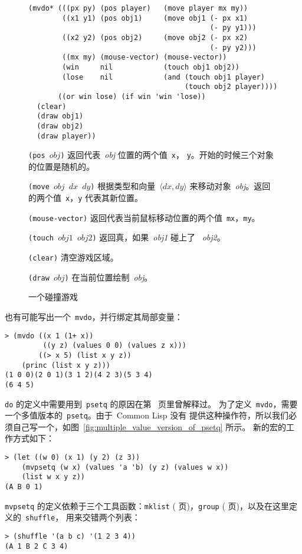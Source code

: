 \begin{figure}
\begin{lstlisting}
(mvdo* (((px py) (pos player)   (move player mx my))
        ((x1 y1) (pos obj1)     (move obj1 (- px x1)
                                           (- py y1)))
        ((x2 y2) (pos obj2)     (move obj2 (- px x2)
                                           (- py y2)))
        ((mx my) (mouse-vector) (mouse-vector))
        (win     nil            (touch obj1 obj2))
        (lose    nil            (and (touch obj1 player)
                                     (touch obj2 player))))
       ((or win lose) (if win 'win 'lose))
  (clear)
  (draw obj1)
  (draw obj2)
  (draw player))
\end{lstlisting}
  \texttt{(pos $obj$)} 返回代表~\emph{obj} 位置的两个值~\texttt{x}，
  \texttt{y}。开始的时候三个对象的位置是随机的。

  \texttt{(move $obj$ $dx$ $dy$)} 根据类型和向量~$\langle dx,dy \rangle$
  来移动对象~\emph{obj}。返回的两个值~\texttt{x}，\texttt{y} 代表其新位置。

  \texttt{(mouse-vector)} 返回代表当前鼠标移动位置的两个值~\texttt{mx}，\texttt{my}。

  \texttt{(touch $obj1$ $obj2$)} 返回真，如果~\emph{obj1} 碰上了
  ~\emph{obj2}。

  \texttt{(clear)} 清空游戏区域。

  \texttt{(draw $obj$)} 在当前位置绘制~\emph{obj}。
  \caption{一个碰撞游戏}
  \label{fig:a_game_of_squash}
\end{figure}

也有可能写出一个~\texttt{mvdo}，并行绑定其局部变量：
\begin{lstlisting}
> (mvdo ((x 1 (1+ x))
         ((y z) (values 0 0) (values z x)))
        ((> x 5) (list x y z))
    (princ (list x y z)))
(1 0 0)(2 0 1)(3 1 2)(4 2 3)(5 3 4)
(6 4 5)
\end{lstlisting}

\verb|do| 的定义中需要用到~\verb|psetq| 的原因在第~\pageref{desc:psetq} 页里曾解释过。
为了定义~\texttt{mvdo}，需要一个多值版本的~\texttt{psetq}。由于~Common Lisp 没有
提供这种操作符，所以我们必须自己写一个，如图~\ref{fig:multiple_value_version_of_psetq} 所示。
新的宏的工作方式如下：
\begin{lstlisting}
> (let ((w 0) (x 1) (y 2) (z 3))
    (mvpsetq (w x) (values 'a 'b) (y z) (values w x))
    (list w x y z))
(A B 0 1)
\end{lstlisting}
\texttt{mvpsetq} 的定义依赖于三个工具函数：\texttt{mklist} (\pageref{fun:mklist}
页)，\texttt{group} (\pageref{fun:group} 页)，以及在这里定义的~\texttt{shuffle}，
用来交错两个列表：
\begin{lstlisting}
> (shuffle '(a b c) '(1 2 3 4))
(A 1 B 2 C 3 4)
\end{lstlisting}

